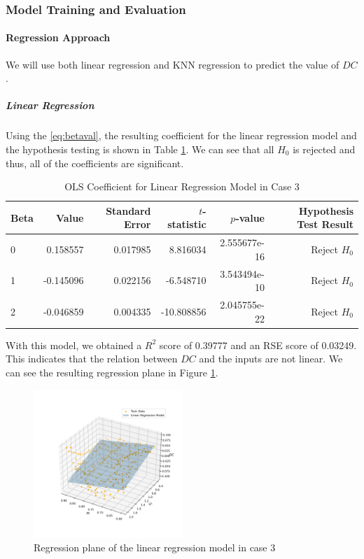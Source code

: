 \documentclass[conf]{new-aiaa}
\begin{document}
\subsubsection{Model Training and Evaluation}
\paragraph{Regression Approach}
We will use both linear regression and KNN regression to predict the value of $DC$.
\subparagraph{Linear Regression} Using the \eqref{eq:betaval}, the resulting coefficient for the linear regression model and the hypothesis testing is shown in Table \ref{tab:case3_ols_coef}. We can see that all $H_0$ is rejected and thus, all of the coefficients are significant. 
\begin{table}
    \centering
    \caption{ \label{tab:case3_ols_coef}OLS Coefficient for Linear Regression Model in Case 3}
    \begin{tabular}{lrrrrr}
        \toprule
        Beta &      Value &  Standard Error &  $t$-statistic &       $p$-value & Hypothesis Test Result \\
        \midrule
        0 &  0.158557 &        0.017985 &     8.816034 &  2.555677e-16 &              Reject $H_0$ \\
        1 & -0.145096 &        0.022156 &    -6.548710 &  3.543494e-10 &              Reject $H_0$ \\
        2 & -0.046859 &        0.004335 &   -10.808856 &  2.045755e-22 &              Reject $H_0$ \\
        \bottomrule
    \end{tabular}
\end{table}
With this model, we obtained a $R^2$ score of 0.39777 and an RSE score of 0.03249. This indicates that the relation between $DC$ and the inputs are not linear. We can see the resulting regression plane in Figure \ref{fig:case3_3d_linreg_plane}.
\begin{figure}
    \centering
    \includegraphics[width=0.5\textwidth]{graph/case3_3d_linreg_plane.png}
    \caption{Regression plane of the linear regression model in case 3}
    \label{fig:case3_3d_linreg_plane}
\end{figure}
\end{document}
